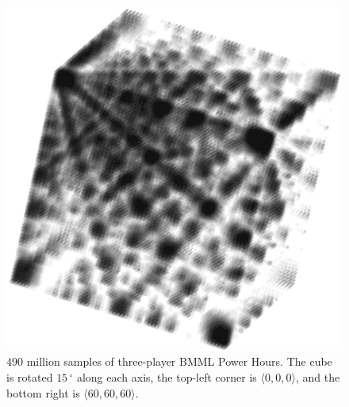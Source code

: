 \documentclass[twocolumn]{article}
\begin{document}
\begin{figure}
\begin{center}
\includegraphics[width=0.90 \linewidth]{sample60min3players3states.png}
\end{center}\vspace{-0.1in}
\caption{490 million samples of three-player BMML Power Hours. The
  cube is rotated $15\,^{\circ}$ along each axis, the top-left corner is
  $\langle 0, 0, 0 \rangle$, and the bottom right is $\langle 60, 60,
  60 \rangle$. }
\label{fig:3d}
\end{figure}
\end{document}
